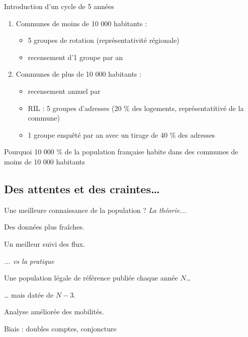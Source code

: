 \documentclass[10pt,xcolor=table,color={dvipsnames,usenames},ignorenonframetext,usepdftitle=false,french]{beamer}
\begin{document}
\begin{frame}{Introduction d'un cycle de 5 années}
\protect\hypertarget{introduction-dun-cycle-de-5-annuxe9es}{}
\begin{enumerate}
\item
  Communes de moins de 10 000 habitants :

  \begin{itemize}
  \item
    5 groupes de rotation (représentativité régionale)
  \item
    recensement  d'1 groupe par an
  \end{itemize}
\end{enumerate}

\medskip 

\begin{enumerate}
\setcounter{enumi}{1}
\item
  Communes de plus de 10 000 habitants :

  \begin{itemize}
  \item
    recensement annuel par 
  \item
    RIL : 5 groupes d'adresses (20 \% des logements, représentatitivé de
    la commune)
  \item
    1 groupe enquêté par an avec un tirage de 40 \% des adresses
  \end{itemize}
\end{enumerate}

Pourquoi 10 000  \% de la population française habite dans
des communes de moins de 10 000 habitants
\end{frame}

\hypertarget{des-attentes-et-des-craintes}{%
\subsection{Des attentes et des
craintes\ldots{}}\label{des-attentes-et-des-craintes}}

\begin{frame}{Une meilleure connaissance de la population ?}
\protect\hypertarget{une-meilleure-connaissance-de-la-population}{}
\textit{La théorie...}

\faPlusSquare{} Des données plus fraîches.

\faPlusSquare{} Un meilleur suivi des flux.

\begin{center}\end{center}

\textit{... vs la pratique}

\faPlusSquare{} Une population légale de référence publiée chaque année
\(N\)\ldots{}

\faMinusSquare{} \ldots{} mais datée de \(N-3\).

\faPlusSquare{} Analyse améliorée des mobilités.

\faMinusSquare{} Biais : doubles comptes, conjoncture
\end{frame}
\end{document}
